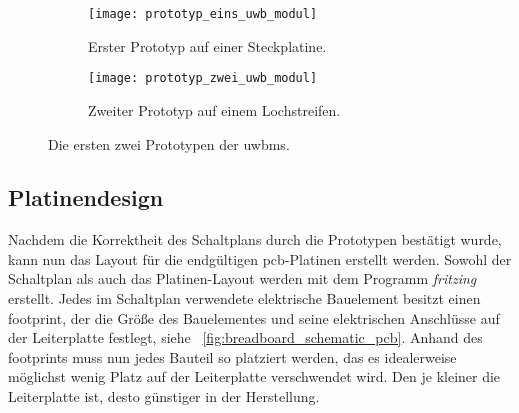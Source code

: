 \begin{figure}
	\begin{subfigure}[t]{0.4\textwidth}
		\texttt{[image: prototyp\_eins\_uwb\_modul]}
		\caption{Erster Prototyp auf einer Steckplatine.}
		\label{fig:prototyp_eins_uwb_modul}
	\end{subfigure}
	\hfill
	\begin{subfigure}[t]{0.4\textwidth}
		\texttt{[image: prototyp\_zwei\_uwb\_modul]}
		\caption{Zweiter Prototyp auf einem Lochstreifen.}
		\label{fig:prototyp_zwei_uwb_modul}
	\end{subfigure}
	\caption{Die ersten zwei Prototypen der \glspl{uwbm}.}
	\label{fig:prototypen_der_uwb_module}
\end{figure}


%
%
\subsection{Platinendesign}

Nachdem die Korrektheit des Schaltplans durch die Prototypen bestätigt wurde, kann nun das Layout für die endgültigen \Gls{pcb}-Platinen erstellt werden. Sowohl der Schaltplan als auch das Platinen-Layout werden mit dem Programm \textit{fritzing} \cite{fritzing} erstellt. Jedes im Schaltplan verwendete elektrische Bauelement besitzt einen \Gls{footprint}, der die Größe des Bauelementes und seine elektrischen Anschlüsse auf der Leiterplatte festlegt, siehe \figurename~\ref{fig:breadboard_schematic_pcb}. Anhand des \Glspl{footprint} muss nun jedes Bauteil so platziert werden, das es idealerweise möglichst wenig Platz auf der Leiterplatte verschwendet wird. Den je kleiner die Leiterplatte ist, desto günstiger in der Herstellung.

